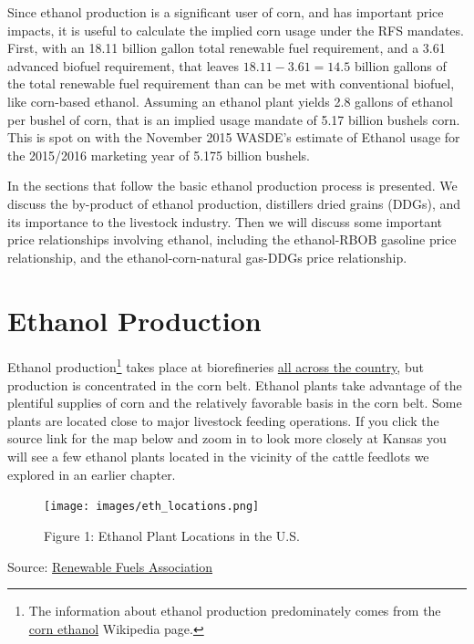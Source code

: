 \documentclass[
]{book}
\begin{document}
Since ethanol production is a significant user of corn, and has important price impacts, it is useful to calculate the implied corn usage under the RFS mandates. First, with an 18.11 billion gallon total renewable fuel requirement, and a 3.61 advanced biofuel requirement, that leaves \(18.11 - 3.61 = 14.5\) billion gallons of the total renewable fuel requirement than can be met with conventional biofuel, like corn-based ethanol. Assuming an ethanol plant yields 2.8 gallons of ethanol per bushel of corn, that is an implied usage mandate of 5.17 billion bushels corn. This is spot on with the November 2015 WASDE's estimate of Ethanol usage for the 2015/2016 marketing year of 5.175 billion bushels.

In the sections that follow the basic ethanol production process is presented. We discuss the by-product of ethanol production, distillers dried grains (DDGs), and its importance to the livestock industry. Then we will discuss some important price relationships involving ethanol, including the ethanol-RBOB gasoline price relationship, and the ethanol-corn-natural gas-DDGs price relationship.

\hypertarget{ethanol-production}{%
\section{Ethanol Production}\label{ethanol-production}}

Ethanol production\footnote{The information about ethanol production predominately comes from the \href{https://en.wikipedia.org/wiki/Corn_ethanol}{corn ethanol} Wikipedia page.} takes place at biorefineries \href{http://www.ethanolrfa.org/resources/biorefinery-locations/}{all across the country}, but production is concentrated in the corn belt. Ethanol plants take advantage of the plentiful supplies of corn and the relatively favorable basis in the corn belt. Some plants are located close to major livestock feeding operations. If you click the source link for the map below and zoom in to look more closely at Kansas you will see a few ethanol plants located in the vicinity of the cattle feedlots we explored in an earlier chapter.

\begin{figure}
\centering
\texttt{[image: images/eth\_locations.png]}
\caption{Figure 1: Ethanol Plant Locations in the U.S.}
\end{figure}

Source: \href{http://www.ethanolrfa.org/resources/biorefinery-locations/}{Renewable Fuels Association}
\end{document}
